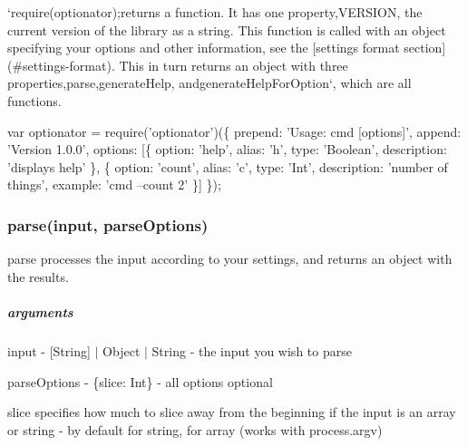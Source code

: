 `require(\textquotesingle{}optionator\textquotesingle{});{\ttfamily returns a function. It has one property,}V\+E\+R\+S\+I\+O\+N{\ttfamily , the current version of the library as a string. This function is called with an object specifying your options and other information, see the \mbox{[}settings format section\mbox{]}(\#settings-\/format). This in turn returns an object with three properties,}parse{\ttfamily ,}generate\+Help{\ttfamily , and}generate\+Help\+For\+Option`, which are all functions.


\begin{DoxyCode}
var optionator = require(\textcolor{stringliteral}{'optionator'})(\{
  prepend: \textcolor{stringliteral}{'Usage: cmd [options]'},
  append: \textcolor{stringliteral}{'Version 1.0.0'},
  options: [\{
    option: \textcolor{stringliteral}{'help'},
    alias: \textcolor{charliteral}{'h'},
    type: \textcolor{stringliteral}{'Boolean'},
    description: \textcolor{stringliteral}{'displays help'}
  \}, \{
    option: \textcolor{stringliteral}{'count'},
    alias: \textcolor{charliteral}{'c'},
    type: \textcolor{stringliteral}{'Int'},
    description: \textcolor{stringliteral}{'number of things'},
    example: \textcolor{stringliteral}{'cmd --count 2'}
  \}]
\});
\end{DoxyCode}


\subsubsection*{parse(input, parse\+Options)}

{\ttfamily parse} processes the {\ttfamily input} according to your settings, and returns an object with the results.

\subparagraph*{arguments}


\begin{DoxyItemize}
\item input -\/ {\ttfamily \mbox{[}String\mbox{]} $\vert$ Object $\vert$ String} -\/ the input you wish to parse
\item parse\+Options -\/ {\ttfamily \{slice\+: Int\}} -\/ all options optional
\begin{DoxyItemize}
\item {\ttfamily slice} specifies how much to slice away from the beginning if the input is an array or string -\/ by default {} for string, {} for array (works with {\ttfamily process.\+argv})
\end{DoxyItemize}
\end{DoxyItemize}

